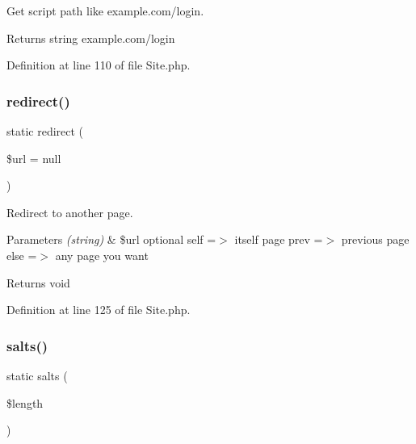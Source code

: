 Get script path like example.\+com/login.

\begin{DoxyReturn}{Returns}
string example.\+com/login 
\end{DoxyReturn}


Definition at line 110 of file Site.\+php.

\mbox{\label{class_zest_1_1_site_1_1_site_a42b47107f2c916b4cad673709d8d6eb6}} 
\subsubsection{\texorpdfstring{redirect()}{redirect()}}
{\footnotesize\ttfamily static redirect (\begin{DoxyParamCaption}\item[{}]{\$url = {\ttfamily null} }\end{DoxyParamCaption})\hspace{0.3cm}{\ttfamily [static]}}

Redirect to another page.


\begin{DoxyParams}{Parameters}
{\em (string)} & \$url optional self =$>$ itself page prev =$>$ previous page else =$>$ any page you want\\
\hline
\end{DoxyParams}
\begin{DoxyReturn}{Returns}
void 
\end{DoxyReturn}


Definition at line 125 of file Site.\+php.

\mbox{\label{class_zest_1_1_site_1_1_site_ad2f560b79e6c8bcd9573904aa4fee525}} 
\subsubsection{\texorpdfstring{salts()}{salts()}}
{\footnotesize\ttfamily static salts (\begin{DoxyParamCaption}\item[{}]{\$length }\end{DoxyParamCaption})\hspace{0.3cm}{\ttfamily [static]}}

